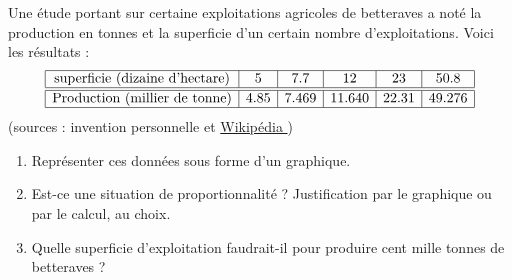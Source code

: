 
\begin{exercice}\label{exo2smath-0019}

    Une étude portant sur certaine exploitations agricoles de betteraves a noté la production en tonnes et la superficie d'un certain nombre d'exploitations. Voici les résultats :
    \begin{equation*}
        \begin{array}[]{|c|c|c|c|c|c|}
            \hline
            \text{superficie (dizaine d'hectare)}&5      &   7.7    &  12    &  23     &   50.8\\
              \hline\hline
              \text{Production (millier de tonne)}&4.85  &  7.469&   11.640   &   22.31 &   49.276\\ 
              \hline 
               \end{array}
    \end{equation*}
    (sources : invention personnelle et \href{ http://fr.wikipedia.org/wiki/Rendement_agricole }{ Wikipédia })
    \begin{enumerate}
        \item
            Représenter ces données sous forme d'un graphique.
        \item
            Est-ce une situation de proportionnalité ? Justification par le graphique ou par le calcul, au choix.
        \item
            Quelle superficie d'exploitation faudrait-il pour produire cent mille tonnes de betteraves ?
    \end{enumerate}

\end{exercice}
